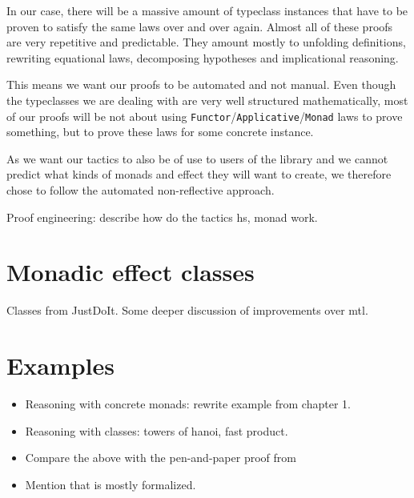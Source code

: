 \documentclass[declaration,inz,english,shortabstract]{iithesis}
\newcommand{\m}[1]{\texttt{#1}}
\begin{document}
In our case, there will be a massive amount of typeclass instances that have to be proven to satisfy the same laws over and over again. Almost all of these proofs are very repetitive and predictable. They amount mostly to unfolding definitions, rewriting equational laws, decomposing hypotheses and implicational reasoning.

This means we want our proofs to be automated and not manual. Even though the typeclasses we are dealing with are very well structured mathematically, most of our proofs will be not about using \m{Functor}/\m{Applicative}/\m{Monad} laws to prove something, but to prove these laws for some concrete instance.

As we want our tactics to also be of use to users of the library and we cannot predict what kinds of monads and effect they will want to create, we therefore chose to follow the automated non-reflective approach.



Proof engineering: describe how do the tactics hs, monad work.


\section{Monadic effect classes}

Classes from JustDoIt. Some deeper discussion of improvements over mtl.


\section{Examples}

\begin{itemize}
    \item Reasoning with concrete monads: rewrite example from chapter 1.
    \item Reasoning with classes: towers of hanoi, fast product.
    \item Compare the above with the pen-and-paper proof from \cite{JustDoIt}
    \item Mention that \cite{JustDoIt} is mostly formalized.
\end{itemize}
\end{document}

